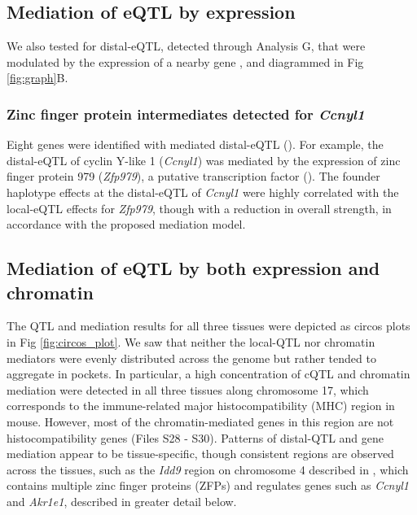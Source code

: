 \documentclass[10pt,letterpaper]{article}
\begin{document}
\subsection*{Mediation of eQTL by expression} 

We also tested for distal-eQTL, detected through Analysis G, that were modulated by the expression of a nearby gene \cite{Keller2018}, and diagrammed in Fig \ref{fig:graph}B. 

\subsubsection*{Zinc finger protein intermediates detected for \textit{Ccnyl1}}
Eight genes were identified with mediated distal-eQTL (). For example, the distal-eQTL of cyclin Y-like 1 (\textit{Ccnyl1}) was mediated by the expression of zinc finger protein 979 (\textit{Zfp979}), a putative transcription factor (). The founder haplotype effects at the distal-eQTL of \textit{Ccnyl1} were highly correlated with the local-eQTL effects for \textit{Zfp979}, though with a reduction in overall strength, in accordance with the proposed mediation model.

\subsection*{Mediation of eQTL by both expression and chromatin}
The QTL and mediation results for all three tissues were depicted as circos plots \cite{Gu2014} in Fig \ref{fig:circos_plot}. We saw that neither the local-QTL nor chromatin mediators were evenly distributed across the genome but rather tended to aggregate in pockets. In particular, a high concentration of cQTL and chromatin mediation were detected in all three tissues along chromosome 17, which corresponds to the immune-related major histocompatibility (MHC) region in mouse. However, most of the chromatin-mediated genes in this region are not histocompatibility genes (Files S28 - S30). Patterns of distal-QTL and gene mediation appear to be tissue-specific, though consistent regions are observed across the tissues, such as the \textit{Idd9} region on chromosome 4 described in \cite{HamiltonWilliams2010}, which contains multiple zinc finger proteins (ZFPs) and regulates genes such as \textit{Ccnyl1} and \textit{Akr1e1}, described in greater detail below.
\end{document}
